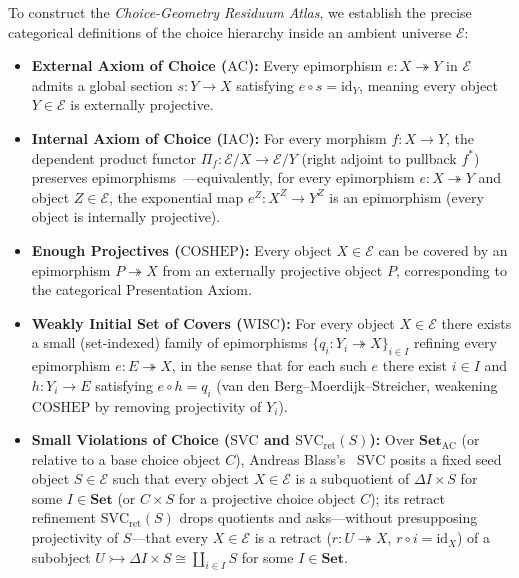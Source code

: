 \documentclass[10pt,twoside,openright]{book}
\theoremstyle{crmplain}
\theoremstyle{crmdef}
\theoremstyle{crmremark}
\begin{document}
To construct the \emph{Choice-Geometry Residuum Atlas}, we establish the precise categorical definitions of the choice hierarchy inside an ambient universe $\mathcal{E}$:

\begin{itemize}[leftmargin=1.5em]

  \item \textbf{External Axiom of Choice ($\mathrm{AC}$):} Every epimorphism $e: X \twoheadrightarrow Y$ in $\mathcal{E}$ admits a global section $s: Y \to X$ satisfying $e \circ s = \mathrm{id}_Y$, meaning every object $Y \in \mathcal{E}$ is externally projective.

  \item \textbf{Internal Axiom of Choice ($\mathrm{IAC}$):} For every morphism $f: X \to Y$, the dependent product functor $\Pi_f: \mathcal{E}/X \to \mathcal{E}/Y$ (right adjoint to pullback $f^*$) preserves epimorphisms~\cite{Johnstone02}---equivalently, for every epimorphism $e: X \twoheadrightarrow Y$ and object $Z \in \mathcal{E}$, the exponential map $e^Z: X^Z \to Y^Z$ is an epimorphism (every object is internally projective).

  \item \textbf{Enough Projectives ($\mathrm{COSHEP}$):} Every object $X \in \mathcal{E}$ can be covered by an epimorphism $P \twoheadrightarrow X$ from an externally projective object $P$, corresponding to the categorical Presentation Axiom.

  \item \textbf{Weakly Initial Set of Covers ($\mathrm{WISC}$):} For every object $X \in \mathcal{E}$ there exists a small (set-indexed) family of epimorphisms $\{q_i : Y_i \twoheadrightarrow X\}_{i \in I}$ refining every epimorphism $e : E \twoheadrightarrow X$, in the sense that for each such $e$ there exist $i \in I$ and $h : Y_i \to E$ satisfying $e \circ h = q_i$ (van den Berg--Moerdijk--Streicher, weakening $\mathrm{COSHEP}$ by removing projectivity of $Y_i$).

  \item \textbf{Small Violations of Choice ($\mathrm{SVC}$ and $\mathrm{SVC}_{\mathrm{ret}}(S)$):} Over $\mathbf{Set}_{\mathrm{AC}}$ (or relative to a base choice object $C$), Andreas Blass's~\cite{Blass79} $\mathrm{SVC}$ posits a fixed seed object $S \in \mathcal{E}$ such that every object $X \in \mathcal{E}$ is a subquotient of $\Delta I \times S$ for some $I \in \mathbf{Set}$ (or $C \times S$ for a projective choice object $C$); its retract refinement $\mathrm{SVC}_{\mathrm{ret}}(S)$ drops quotients and asks---without presupposing projectivity of $S$---that every $X \in \mathcal{E}$ is a retract ($r : U \twoheadrightarrow X$, $r \circ i = \mathrm{id}_X$) of a subobject $U \rightarrowtail \Delta I \times S \cong \coprod_{i \in I} S$ for some $I \in \mathbf{Set}$.


\end{itemize}
\end{document}
